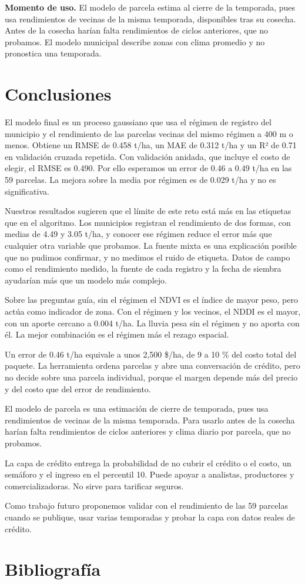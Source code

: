 \documentclass[11pt,letterpaper]{article}
\begin{document}
\textbf{Momento de uso.} El modelo de parcela estima al cierre de la temporada, pues usa rendimientos de vecinas de la misma temporada, disponibles tras su cosecha. Antes de la cosecha harían falta rendimientos de ciclos anteriores, que no probamos. El modelo municipal describe zonas con clima promedio y no pronostica una temporada.

\section{Conclusiones}

El modelo final es un proceso gaussiano que usa el régimen de registro del municipio y el rendimiento de las parcelas vecinas del mismo régimen a 400 m o menos. Obtiene un RMSE de 0.458 t/ha, un MAE de 0.312 t/ha y un R² de 0.71 en validación cruzada repetida. Con validación anidada, que incluye el costo de elegir, el RMSE es 0.490. Por ello esperamos un error de 0.46 a 0.49 t/ha en las 59 parcelas. La mejora sobre la media por régimen es de 0.029 t/ha y no es significativa.

Nuestros resultados sugieren que el límite de este reto está más en las etiquetas que en el algoritmo. Los municipios registran el rendimiento de dos formas, con medias de 4.49 y 3.05 t/ha, y conocer ese régimen reduce el error más que cualquier otra variable que probamos. La fuente mixta es una explicación posible que no pudimos confirmar, y no medimos el ruido de etiqueta. Datos de campo como el rendimiento medido, la fuente de cada registro y la fecha de siembra ayudarían más que un modelo más complejo.

Sobre las preguntas guía, sin el régimen el NDVI es el índice de mayor peso, pero actúa como indicador de zona. Con el régimen y los vecinos, el NDDI es el mayor, con un aporte cercano a 0.004 t/ha. La lluvia pesa sin el régimen y no aporta con él. La mejor combinación es el régimen más el rezago espacial.

Un error de 0.46 t/ha equivale a unos 2,500 \$/ha, de 9 a 10 \% del costo total del paquete. La herramienta ordena parcelas y abre una conversación de crédito, pero no decide sobre una parcela individual, porque el margen depende más del precio y del costo que del error de rendimiento.

El modelo de parcela es una estimación de cierre de temporada, pues usa rendimientos de vecinas de la misma temporada. Para usarlo antes de la cosecha harían falta rendimientos de ciclos anteriores y clima diario por parcela, que no probamos.

La capa de crédito entrega la probabilidad de no cubrir el crédito o el costo, un semáforo y el ingreso en el percentil 10. Puede apoyar a analistas, productores y comercializadoras. No sirve para tarificar seguros.

Como trabajo futuro proponemos validar con el rendimiento de las 59 parcelas cuando se publique, usar varias temporadas y probar la capa con datos reales de crédito.


\section*{Bibliografía}
\setlength{\parskip}{0pt}

\end{document}
